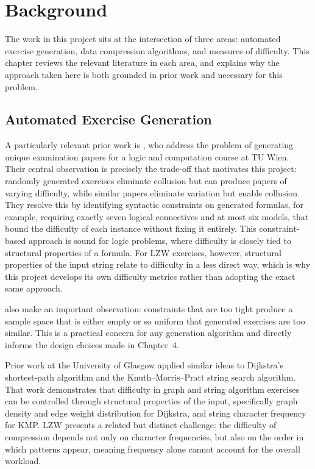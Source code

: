 \documentclass{l4proj}
\begin{document}
\chapter{Background}
 
The work in this project sits at the intersection of three areas: automated exercise generation, data compression algorithms, and measures of difficulty. This chapter reviews the relevant literature in each area, and explains why the approach taken here is both grounded in prior work and necessary for this problem.

\section{Automated Exercise Generation}
 
A particularly relevant prior work is \citet{Hoz21}, who address the problem of generating unique examination papers for a logic and computation course at TU Wien. Their central observation is precisely the trade-off that motivates this project: randomly generated exercises eliminate collusion but can produce  papers of varying difficulty, while similar papers eliminate variation but enable collusion. They resolve this by identifying syntactic constraints on generated formulas, for example, requiring exactly seven logical connectives and at most six models, that bound the difficulty of each instance without fixing it entirely. This constraint-based approach is sound for logic problems, where difficulty is closely tied to structural properties of a formula. For LZW exercises, however, structural properties of the input string relate to difficulty in a less direct way, which is why this project develops its own difficulty metrics rather than adopting the exact same approach.
 
\citet{Hoz21} also make an important observation: constraints that are too tight produce a sample space that is either empty or so uniform that generated exercises are too similar. This is a practical concern for any generation algorithm and directly informs the design choices made in Chapter~4.
 
Prior work at the University of Glasgow \citep{PriorGlasgow} applied similar ideas to Dijkstra's shortest-path algorithm and the Knuth--Morris--Pratt string search algorithm. That work demonstrates that difficulty in graph and string algorithm exercises can be controlled through structural properties of the input, specifically graph density and edge weight distribution for Dijkstra, and string character frequency for KMP. LZW presents a related but distinct challenge: the difficulty of compression depends not only on character frequencies, but also on the order in which patterns appear, meaning frequency alone cannot account for the overall workload.
 
\end{document}
